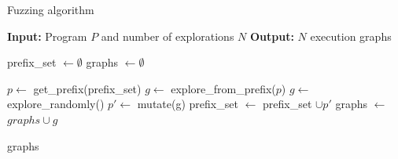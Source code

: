 \begin{algorithm}
    \caption{Fuzzing algorithm}
    \label{fuzzer}
    \begin{algorithmic}[1]
    \STATE \textbf{Input:} Program $P$ and number of explorations $N$ \label{line:input}
    \STATE \textbf{Output:} $N$ execution graphs
    
    \STATE prefix\_set $\leftarrow \emptyset$ \label{line:init_prefix}
    \STATE graphs $\leftarrow \emptyset$ 
    
            \STATE $p \leftarrow$ get\_prefix(prefix\_set) \label{line:pick_prefix}
            \STATE $g \leftarrow $ explore\_from\_prefix($p$) \label{line:explore_prefix}
        \ELSE 
            \STATE $g \leftarrow $ explore\_randomly() \label{line:random_explore}
        \ENDIF 
         \label{line:is_interesting}
            \STATE $p' \leftarrow$ mutate(g) \label{line:mutate}
            \STATE prefix\_set $\leftarrow$ prefix\_set $\cup p'$      \label{line:add_prefix}  
        \ENDIF
        \STATE graphs $\leftarrow$ $graphs \cup g$      \label{line:add_graph}
    \ENDFOR
    
    \RETURN graphs      \label{line:output}
    \end{algorithmic}
\end{algorithm}












